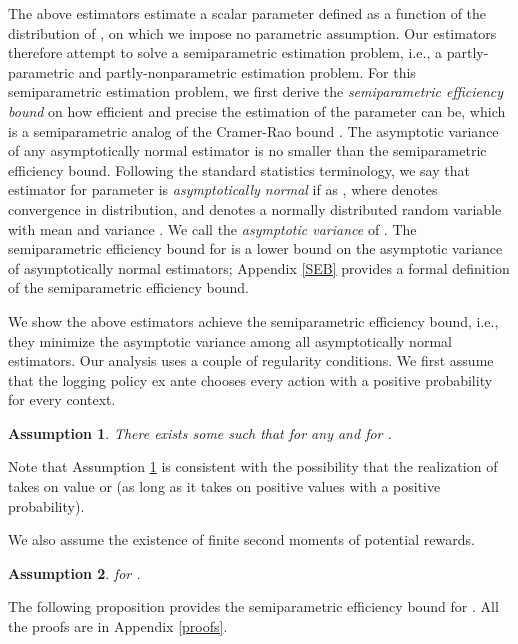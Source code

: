 \documentclass[letterpaper]{article} \usepackage{aaai19}  \usepackage{times}  \usepackage{helvet}  \usepackage{courier}  \usepackage{url}  \usepackage{graphicx}  \frenchspacing  \usepackage{comment}
\newtheorem{assumption}{Assumption}
\newcommand{\citep}{\cite}
\begin{document}
The above estimators estimate a scalar parameter  defined as a function of the distribution of , on which we impose no parametric assumption. 
Our estimators therefore attempt to solve a semiparametric estimation problem, i.e., a partly-parametric and partly-nonparametric estimation problem.
For this semiparametric estimation problem, we first derive the \textit{semiparametric efficiency bound} on how efficient and precise the estimation of the parameter can be, which is a semiparametric analog of the Cramer-Rao bound \citep{Bickel1993}.
The asymptotic variance of any asymptotically normal estimator is no smaller than the semiparametric efficiency bound. 
Following the standard statistics terminology, we say that estimator  for parameter  is \textit{asymptotically normal} if  as , where  denotes convergence in distribution, and  denotes a normally distributed random variable with mean  and variance .
We call  the \textit{asymptotic variance} of .
The semiparametric efficiency bound for  is a lower bound on the asymptotic variance of asymptotically normal estimators; Appendix \ref{SEB} provides a formal definition of the semiparametric efficiency bound. 












We show the above estimators achieve the semiparametric efficiency bound, i.e., they minimize the asymptotic variance among all asymptotically normal estimators. Our analysis uses a couple of regularity conditions. 
We first assume that the logging policy  ex ante chooses every action with a positive probability for every context.


\begin{assumption}\label{nondegeneracy}
	There exists some  such that  for any  and for .
\end{assumption}

\noindent Note that Assumption \ref{nondegeneracy} is consistent with the possibility that the realization of  takes on value  or  (as long as it takes on positive values with a positive probability).

We also assume the existence of finite second moments of potential rewards. 

\begin{assumption}\label{finite_variance}
	 for .
\end{assumption}

The following proposition provides the semiparametric efficiency bound for . 
All the proofs are in Appendix \ref{proofs}. 
\end{document}
